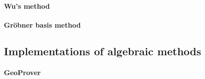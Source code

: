 \documentclass{aicom2e}
\begin{document}
\paragraph{Wu's method}
\begin{comment}
There are two variants of Wu's method: simplified or full. In this
paper we use GeoProver that uses simplified Wu's method. Although,
this method cannot prove all statement, it is very powerful and can be
used for many problems.


Wu's method can be used for proving statement in elementary geometry,
whose hypotheses and conclusions could be written in polynomial form:
\begin{eqnarray*}
h_1 (u_1 , \ldots, u_d , x_1 , \ldots, x_t ) & = & 0 \\
h_2 (u_1 , \ldots, u_d , x_1 , \ldots, x_t ) & = & 0\\
\ldots \\
h_t (u_1 , \ldots, u_d , x_1 , \ldots, x_t ) & = & 0 \\
g(u_1 , \ldots, u_d , x_1 , \ldots, x_t ) & = & 0
\end{eqnarray*}

where $h_1$, $h_2$, $\ldots$, $h_t$ are hypotheses and $g$ is
conclusion and all polynomials belong to the ring
$K[u_1 , \ldots, u_d , x_1 , \ldots, x_t ]$ ($K$ is field). Variables
$u_1$, $u_2$, $\ldots$, $u_t$ are parameters or independent variables,
and variables $x_1$, $x_2$, $\ldots$, $x_t$ are algebraically
dependent in the respect of the variables $u_1$, $u_2$, $\ldots$,
$u_t$ and that dependency is given in the above polynomial system. The
next step is to reduce system to triangular form. To prove theorem
using simple Wu's method it is necessarily to find the final remainder
of polynomial $g$ over triangular system. If the final remainder is
zero, then the theorem has been proved.
\end{comment}
\paragraph{Gr\"obner basis method}
\subsection{Implementations of algebraic methods}
\paragraph{GeoProver}
\end{document}
